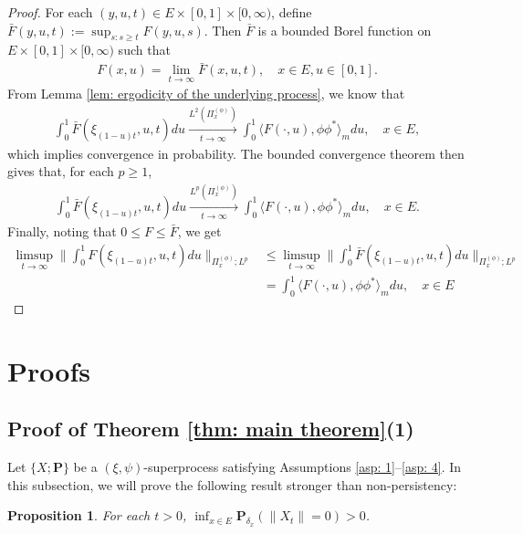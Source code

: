 \documentclass[UTF8]{pkuthss}
\theoremstyle{plain}
\newtheorem{prop}[thm]{Proposition}
\theoremstyle{definition}
\numberwithin{equation}{section}
\begin{document}
\begin{proof}
	For each $(y,u,t)\in E\times [0,1]\times [0,\infty)$, define $\bar F(y,u,t) := \sup_{s:s\geq t} F(y,u,s)$.
	Then $\bar F$ is a bounded Borel  function on $E\times [0,1]\times [0,\infty)$ such that
\begin{align}
	F(x,u)
	= \lim_{t\to \infty} \bar F(x,u,t),
	\quad x\in E, u\in [0,1].
\end{align}
	From Lemma \ref{lem: ergodicity of the underlying process}, we know that
\begin{align}
	\int_0^1 \bar F(\xi_{(1-u)t},u,t) du
	\xrightarrow[t\to \infty]{L^2(\Pi_x^{(\phi)})}
	\int_0^1 \langle F(\cdot , u), \phi\phi^*\rangle_m du,
	\quad x\in E,
\end{align}
    which implies convergence in probability.
	The bounded convergence theorem then gives that, for each $p \geq 1$,
\begin{align}
	\int_0^1 \bar F(\xi_{(1-u)t},u,t) du
	\xrightarrow[t\to \infty]{L^p(\Pi_x^{(\phi)})}
	\int_0^1 \langle F(\cdot , u), \phi\phi^*\rangle_m du,
	\quad x\in E.
\end{align}
	Finally,
    noting that $0\leq F \leq \bar F$, we get
\begin{align}
	\limsup_{ t \to \infty}  \Big\| \int_0^1 F(\xi_{(1-u) t },u,t) du  \Big\|_{\Pi_x^{(\phi)};L^p}
	&\leq \limsup_{ t \to \infty}  \Big\| \int_0^1 \bar F(\xi_{(1-u) t },u,t) du  \Big\|_{\Pi_x^{(\phi)};L^p}
	\\& = \int_0^1 \langle F(\cdot, u), \phi \phi^*\rangle_m du,
	\quad x\in E
\end{align}
\end{proof}

\section{Proofs}
\subsection{Proof of Theorem \ref{thm: main theorem}(1)}
\label{sec: proof of result 1}
	Let $\{X; \mathbf P\}$ be a $(\xi, \psi)$-superprocess satisfying
	Assumptions \ref{asp: 1}--\ref{asp: 4}.
	In this subsection, we will prove the following result stronger than non-persistency:

\begin{prop} \label{prop: non-presistent}
	For each $t > 0$, $\inf_{x\in E} \mathbf P_{\delta_x}(\|X_t\|= 0) > 0$.
\end{prop}
\end{document}
